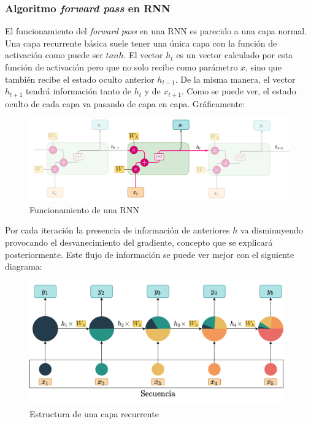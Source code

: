 
\subsubsection{Algoritmo \textit{forward pass} en RNN}

El funcionamiento del \textit{forward pass} en una RNN es parecido a una capa normal. Una capa recurrente básica suele tener una única capa con la función de activación como puede ser $tanh$. El vector $h_t$ es un vector calculado por esta función de activación pero que no solo recibe como parámetro $x$, sino que también recibe el estado oculto anterior $h_{t-1}$. De la misma manera, el vector $h_{t+1}$ tendrá información tanto de $h_{t}$ y de $x_{t+1}$. Como se puede ver, el estado oculto de cada capa va pasando de capa en capa. Gráficamente:

\begin{figure}[H]
    \centering
    \includegraphics[width=14cm]{images/state-of-art/rnn/standard-rnn.png}
    \caption{Funcionamiento de una RNN}
\end{figure}
 
 Por cada iteración la presencia de información de anteriores $h$ va disminuyendo provocando el desvanecimiento del gradiente, concepto que se explicará posteriormente. Este flujo de información se puede ver mejor con el siguiente diagrama:

\begin{figure}[H]
    \centering
    \includegraphics[width=11cm]{images/state-of-art/rnn/simple-rnn.png}
    \caption{Estructura de una capa recurrente}
    \label{fig:simple_rnn}
\end{figure}


